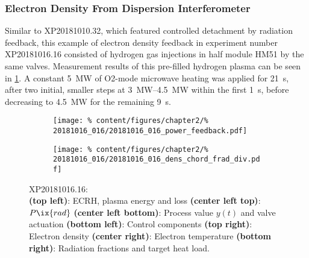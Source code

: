             \subsubsection*{Electron Density From Dispersion Interferometer}%
%
                Similar to XP20181010.32, which featured controlled detachment by radiation feedback, this example of electron density feedback in experiment number XP20181016.16 consisted of hydrogen gas injections in half module HM51 by the same valves. Measurement results of this pre-filled hydrogen plasma can be seen in \cref{fig:20181016.16_PDF}. A constant \SI{5}{\mega\watt} of O2-mode microwave heating was applied for \SI{21}{\second}, after two initial, smaller steps at \SIrange{3}{4.5}{\mega\watt} within the first \SI{1}{\second}, before decreasing to \SI{4.5}{\mega\watt} for the remaining \SI{9}{\second}.\\%
%
                \begin{figure}[t]%
                    \centering%
                    \begin{subfigure}{.48\textwidth}%
                        \centering%
                        \texttt{[image: \%
                            content/figures/chapter2/\%
                            20181016\_016/20181016\_016\_power\_feedback.pdf]}%
                    \end{subfigure}%
                    \hfill%
                    \begin{subfigure}{.48\textwidth}%
                        \centering%
                        \texttt{[image: \%
                            content/figures/chapter2/\%
                            20181016\_016/20181016\_016\_dens\_chord\_frad\_div.pdf]}%
                    \end{subfigure}%
                    \caption{%
                        XP20181016.16:\\%
                        \textbf{(top left)}: ECRH, plasma energy and loss \textbf{(center left top)}: $P\ix{rad}$ \textbf{(center left bottom)}: Process value $y\left(t\right)$ and valve actuation \textbf{(bottom left)}: Control components \textbf{(top right)}: Electron density \textbf{(center right)}: Electron temperature \textbf{(bottom right)}: Radiation fractions and target heat load.}\label{fig:20181016.16_PDF}%
                \end{figure}%
%
